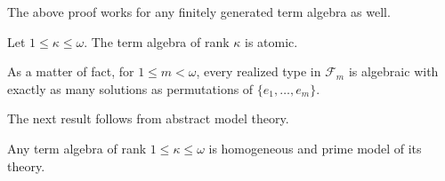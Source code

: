 \documentclass[a4paper,11pt]{article}
\begin{document}
The above proof works for any finitely generated term algebra as well. 

\begin{proposition}
Let $1\leq \kappa \leq \omega$. The term algebra of rank $\kappa$ is atomic.
\end{proposition}

As a matter of fact, for $1\leq m<\omega$, every realized type in $\mathcal{F}_m$ is algebraic with exactly as many solutions as permutations of $\{e_1, \ldots, e_m\}$.

The next result follows from abstract model theory.

\begin{corollary}
Any term algebra of rank $1\leq \kappa\leq \omega$ is homogeneous and prime model of its theory.
\end{corollary}
\end{document}
